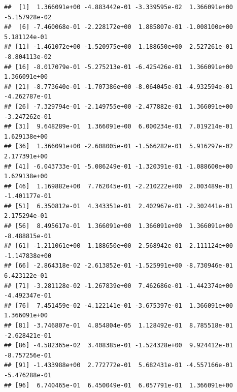 \documentclass[]{article}
\newenvironment{Shaded}{\begin{snugshade}}{\end{snugshade}}
\newcommand{\NormalTok}[1]{{#1}}
\begin{document}
\begin{verbatim}
##  [1]  1.366091e+00 -4.883442e-01 -3.339595e-02  1.366091e+00 -5.157928e-02
##  [6] -7.460068e-01 -2.228172e+00  1.885807e-01 -1.008100e+00  5.181124e-01
## [11] -1.461072e+00 -1.520975e+00  1.188650e+00  2.527261e-01 -8.804113e-02
## [16] -8.017079e-01 -5.275213e-01 -6.425426e-01  1.366091e+00  1.366091e+00
## [21] -8.773640e-01 -1.707386e+00 -8.064045e-01 -4.932594e-01 -4.262787e-01
## [26] -7.329794e-01 -2.149755e+00 -2.477882e-01  1.366091e+00 -3.247262e-01
## [31]  9.648289e-01  1.366091e+00  6.000234e-01  7.019214e-01  1.629138e+00
## [36]  1.366091e+00 -2.608005e-01 -1.566282e-01  5.916297e-02  2.177391e+00
## [41] -6.043733e-01 -5.086249e-01 -1.320391e-01 -1.088600e+00  1.629138e+00
## [46]  1.169882e+00  7.762045e-01 -2.210222e+00  2.003489e-01 -1.401177e-01
## [51]  6.350812e-01  4.343351e-01  2.402967e-01 -2.302441e-01  2.175294e-01
## [56]  8.495617e-01  1.366091e+00  1.366091e+00  1.366091e+00 -8.488815e-01
## [61] -1.211061e+00  1.188650e+00  2.568942e-01 -2.111124e+00 -1.147838e+00
## [66] -2.864318e-02 -2.613852e-01 -1.525991e+00 -8.730946e-01  6.423122e-01
## [71] -3.281128e-02 -1.267839e+00  7.462686e-01 -1.442374e+00 -4.492347e-01
## [76]  7.451459e-02 -4.122141e-01 -3.675397e-01  1.366091e+00  1.366091e+00
## [81] -3.746807e-01  4.854804e-05  1.128492e-01  8.785518e-01 -2.628421e-01
## [86] -4.582365e-02  3.408385e-01 -1.524328e+00  9.924412e-01 -8.757256e-01
## [91] -1.433988e+00  2.772772e-01  5.682431e-01 -4.557166e-01 -5.476288e-01
## [96]  6.740465e-01  6.450049e-01  6.057791e-01  1.366091e+00
\end{verbatim}

\begin{Shaded}
\end{Shaded}
\end{document}
